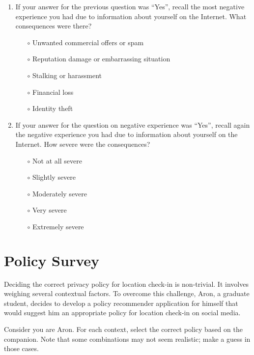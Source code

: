 \begin{enumerate}
\item If your answer for the previous question was ``Yes'', recall the most negative experience you had due to information about yourself on the Internet. What consequences were there?

\begin{itemize}
\item[$\circ$] Unwanted commercial offers or spam
\item[$\circ$] Reputation damage or embarrassing situation
\item[$\circ$] Stalking or harassment
\item[$\circ$] Financial loss
\item[$\circ$] Identity theft
\end{itemize}

\item If your answer for the question on negative experience was ``Yes'', recall again the negative experience you had due to information about yourself on the Internet. How severe were the consequences?

\begin{itemize}
\item[$\circ$] Not at all severe
\item[$\circ$] Slightly severe
\item[$\circ$] Moderately severe
\item[$\circ$] Very severe
\item[$\circ$] Extremely severe
\end{itemize}

\end{enumerate}

\section{Policy Survey}
\label{appsec:policy-survey}

Deciding the correct privacy policy for location check-in is non-trivial. It involves weighing several contextual factors. To overcome this challenge, Aron, a graduate student, decides to develop a policy recommender application for himself that would suggest him an appropriate policy for location check-in on social media.

Consider you are Aron. For each context, select the correct policy based on the companion. Note that some combinations may not seem realistic; make a guess in those cases. 

